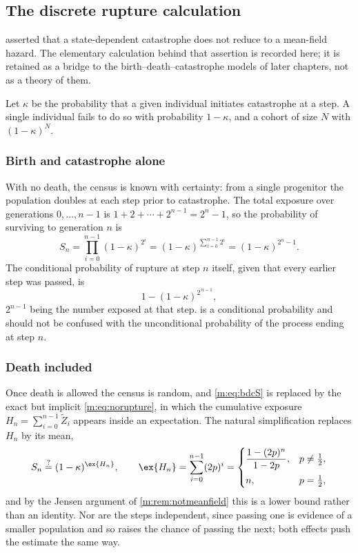 \subsection{The discrete rupture calculation}
\label{m:app:discreterupture}

 asserted that a state-dependent catastrophe does not
reduce to a mean-field hazard. The elementary calculation behind that assertion is
recorded here; it is retained as a bridge to the birth--death--catastrophe models
of later chapters, not as a theory of them.

Let $\kappa$ be the probability that a given individual initiates catastrophe at a
step. A single individual fails to do so with probability $1-\kappa$, and a cohort
of size $N$ with $(1-\kappa)^N$.

\subsubsection*{Birth and catastrophe alone}

With no death, the census is known with certainty: from a single progenitor the
population doubles at each step prior to catastrophe. The total exposure over
generations $0,\dots,n-1$ is $1+2+\cdots+2^{n-1} = 2^n-1$, so the probability of
surviving to generation $n$ is
\begin{equation}
\label{m:eq:bdcS}
S_n = \prod_{i=0}^{n-1}(1-\kappa)^{2^i}
= (1-\kappa)^{\sum_{i=0}^{n-1}2^i}
= (1-\kappa)^{2^n-1} .
\end{equation}
The conditional probability of rupture at step $n$ itself, given that every earlier
step was passed, is
\begin{equation}
\label{m:eq:bdchalt}
1-(1-\kappa)^{2^{\,n-1}},
\end{equation}
$2^{n-1}$ being the number exposed at that step.  is a
conditional probability and should not be confused with the unconditional
probability of the process ending at step $n$.

\subsubsection*{Death included}

Once death is allowed the census is random, and \cref{m:eq:bdcS} is replaced by the
exact but implicit \cref{m:eq:norupture}, in which the cumulative exposure
$H_n = \sum_{i=0}^{n-1}\widetilde Z_i$ appears inside an expectation. The natural
simplification replaces $H_n$ by its mean,
\begin{equation}
\label{m:eq:bdcguess}
S_n\overset{?}{=}(1-\kappa)^{\ex{H_n}},
\qquad
\ex{H_n} = \sum_{i=0}^{n-1}(2p)^i
= \begin{cases}
\dfrac{1-(2p)^n}{1-2p}, & p\neq\tfrac12,\\[8pt]
n, & p=\tfrac12,
\end{cases}
\end{equation}
and by the Jensen argument of \cref{m:rem:notmeanfield} this is a lower bound rather
than an identity. Nor are the steps independent, since passing one is evidence of a
smaller population and so raises the chance of passing the next; both effects push
the estimate the same way.


